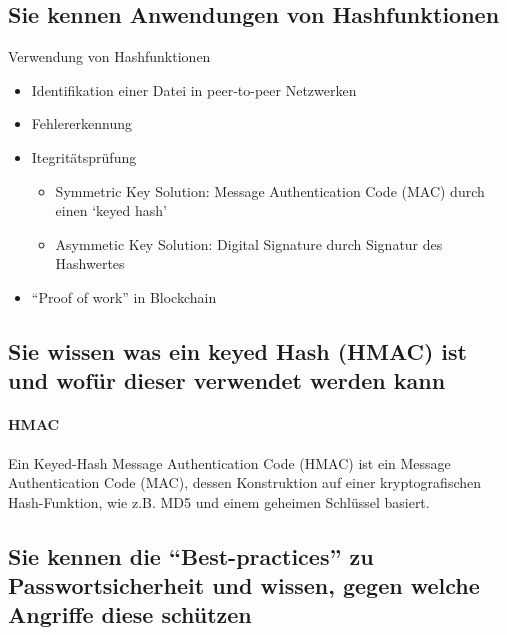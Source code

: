 \documentclass[10pt,a4paper]{article}
\begin{document}
\subsection*{Sie kennen Anwendungen von Hashfunktionen}
Verwendung von Hashfunktionen
\begin{itemize}[noitemsep,topsep=0pt,leftmargin=*]
    \item Identifikation einer Datei in peer-to-peer Netzwerken
    \item Fehlererkennung
    \item Itegritätsprüfung
    \begin{itemize}[noitemsep,topsep=0pt,leftmargin=*]
        \item Symmetric Key Solution: Message Authentication Code (MAC) durch einen `keyed hash'
        \item Asymmetic Key Solution: Digital Signature durch Signatur des Hashwertes
    \end{itemize}
    \item "`Proof of work"' in Blockchain
\end{itemize}


\subsection*{Sie wissen was ein keyed Hash (HMAC) ist und wofür dieser verwendet werden kann}

\paragraph*{HMAC}Ein Keyed-Hash Message Authentication Code (HMAC) ist ein Message Authentication Code (MAC), dessen Konstruktion auf einer kryptografischen Hash-Funktion, wie z.B. MD5 und einem geheimen Schlüssel basiert.


\subsection*{Sie kennen die "`Best-practices"' zu Passwortsicherheit und wissen, gegen welche Angriffe diese schützen}
\end{document}
